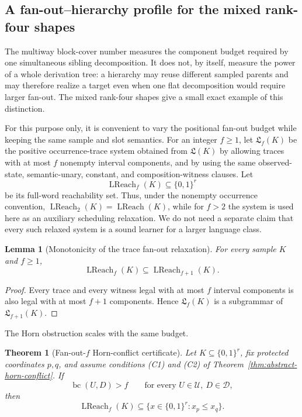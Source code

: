 \documentclass[11pt]{article}
\newtheorem{lemma}[definition]{Lemma}
\newtheorem{theorem}[definition]{Theorem}
\begin{document}
\subsection{A fan-out--hierarchy profile for the mixed rank-four shapes}
\label{subsec:fanout-hierarchy-profile}

The multiway block-cover number measures the component budget required by one
simultaneous sibling decomposition.  It does not, by itself, measure the power
of a whole derivation tree: a hierarchy may reuse different sampled parents and
may therefore realize a target even when one flat decomposition would require
larger fan-out.  The mixed rank-four shapes give a small exact example of this
distinction.

For this purpose only, it is convenient to vary the positional fan-out budget
while keeping the same sample and slot semantics.  For an integer $f\ge1$, let
$\mathfrak L_f(K)$ be the positive occurrence-trace system obtained from
$\mathfrak L(K)$ by allowing traces with at most $f$ nonempty interval
components, and by using the same observed-state, semantic-unary, constant,
and composition-witness clauses.  Let
\[
  \operatorname{LReach}_f(K)\subseteq\{0,1\}^r
\]
be its full-word reachability set.  Thus, under the nonempty occurrence convention,
$\operatorname{LReach}_2(K)=\operatorname{LReach}(K)$, while for $f>2$ the
system is used here as an auxiliary scheduling relaxation.  We do not need a
separate claim that every such relaxed system is a sound learner for a larger
language class.

\begin{lemma}[Monotonicity of the trace fan-out relaxation]
\label{lem:trace-fanout-monotone}
For every sample $K$ and $f\ge1$,
\[
  \operatorname{LReach}_f(K)
  \subseteq
  \operatorname{LReach}_{f+1}(K).
\]
\end{lemma}

\begin{proof}
Every trace and every witness legal with at most $f$ interval components is
also legal with at most $f+1$ components.  Hence $\mathfrak L_f(K)$ is a
subgrammar of $\mathfrak L_{f+1}(K)$.
\end{proof}

The Horn obstruction scales with the same budget.

\begin{theorem}[Fan-out-$f$ Horn-conflict certificate]
\label{thm:fanout-f-horn-conflict}
Let $K\subseteq\{0,1\}^r$, fix protected coordinates $p,q$, and assume
conditions \textup{(C1)} and \textup{(C2)} of
Theorem~\ref{thm:abstract-horn-conflict}.  If
\[
  \operatorname{bc}(U,D)>f
  \qquad
  \text{for every }U\in\mathcal U,\ D\in\mathcal D,
\]
then
\[
  \operatorname{LReach}_f(K)
  \subseteq
  \{x\in\{0,1\}^r:x_p\le x_q\}.
\]
\end{theorem}
\end{document}
